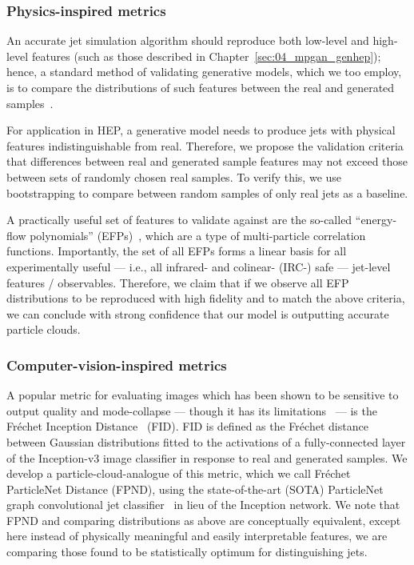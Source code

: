 \subsubsection{Physics-inspired metrics}

An accurate jet simulation algorithm should reproduce both low-level and high-level features (such as those described in Chapter~\ref{sec:04_mpgan_genhep}); hence, a standard method of validating generative models, which we too employ, is to compare the distributions of such features between the real and generated samples~\cite{deOliveira:2017pjk, Paganini:2017dwg, ATL-SOFT-PUB-2020-006, Erdmann:2018jxd, Carminati:2020kym, Sekmen:2016iql}. 

For application in HEP, a generative model needs to produce jets with physical features indistinguishable from real.
Therefore, we propose the validation criteria that differences between real and generated sample features may not exceed those between sets of randomly chosen real samples.
To verify this, we use bootstrapping to compare between random samples of only real jets as a baseline. 

A practically useful set of features to validate against are the so-called ``energy-flow polynomials'' (EFPs)~\cite{Komiske:2017aww}, which are a type of multi-particle correlation functions. 
Importantly, the set of all EFPs forms a linear basis for all experimentally useful --- i.e., all infrared- and colinear- (IRC-) safe --- jet-level features / observables.
Therefore, we claim that if we observe all EFP distributions to be reproduced with high fidelity and to match the above criteria, we can conclude with strong confidence that our model is outputting accurate particle clouds. 

\subsubsection{Computer-vision-inspired metrics}
A popular metric for evaluating images which has been shown to be sensitive to output quality and mode-collapse --- though it has its limitations~\cite{borji2021} --- is the Fr\'{e}chet Inception Distance~\cite{TTUR} (FID). 
FID is defined as the Fr\'{e}chet distance between Gaussian distributions fitted to the activations of a fully-connected layer of the Inception-v3 image classifier in response to real and generated samples. 
We develop a particle-cloud-analogue of this metric, which we call Fr\'{e}chet ParticleNet Distance (FPND), using the state-of-the-art (SOTA) ParticleNet graph convolutional jet classifier~\cite{Qu:2019gqs} in lieu of the Inception network.
We note that FPND and comparing distributions as above are conceptually equivalent, except here instead of physically meaningful and easily interpretable features, we are comparing those found to be statistically optimum for distinguishing jets.

